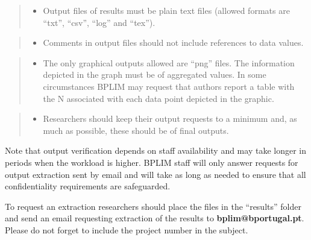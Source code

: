 \documentclass[
  a4paper,
  DIV=11,
  numbers=noendperiod]{scrartcl}
\providecommand{\tightlist}{%
  \setlength{\itemsep}{0pt}\setlength{\parskip}{0pt}}\usepackage{longtable,booktabs,array}
\begin{document}
\begin{quote}
\begin{itemize}
\tightlist
\item
  Output files of results must be plain text files (allowed formats are
  ``txt'', ``csv'', ``log'' and ``tex'').
\end{itemize}
\end{quote}

\begin{quote}
\begin{itemize}
\tightlist
\item
  Comments in output files should not include references to data values.
\end{itemize}
\end{quote}

\begin{quote}
\begin{itemize}
\tightlist
\item
  The only graphical outputs allowed are ``png'' files. The information
  depicted in the graph must be of aggregated values. In some
  circumstances BPLIM may request that authors report a table with the N
  associated with each data point depicted in the graphic.
\end{itemize}
\end{quote}

\begin{quote}
\begin{itemize}
\tightlist
\item
  Researchers should keep their output requests to a minimum and, as
  much as possible, these should be of final outputs.
\end{itemize}
\end{quote}

Note that output verification depends on staff availability and may take
longer in periods when the workload is higher. BPLIM staff will only
answer requests for output extraction sent by email and will take as
long as needed to ensure that all confidentiality requirements are
safeguarded.

To request an extraction researchers should place the files in the
``results'' folder and send an email requesting extraction of the
results to \textbf{bplim@bportugal.pt}. Please do not forget to include
the project number in the subject.
\end{document}
